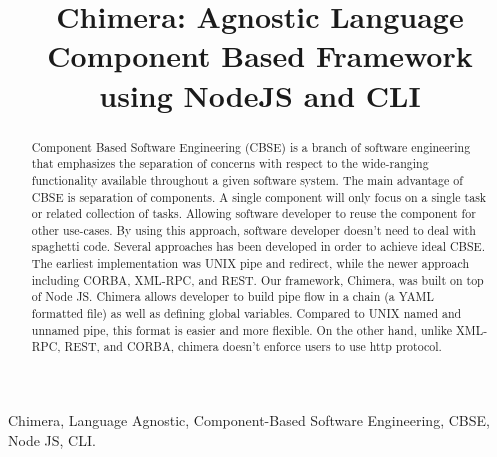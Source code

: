 \documentclass[conference]{IEEEtran}
\begin{document}
\title{Chimera: Agnostic Language Component Based Framework using NodeJS and CLI}

\author{
\and
{}
\and
{}
}

\maketitle


\begin{abstract}
Component Based Software Engineering (CBSE) is a branch of software 
engineering that emphasizes the separation of concerns with respect to the 
wide-ranging functionality available throughout a given software system.  The 
main advantage of CBSE is separation of components. A single component will 
only focus on a single task or related collection of tasks. Allowing software 
developer to reuse the component for other use-cases. By using this approach, 
software developer doesn't need to deal with spaghetti code. Several 
approaches has been developed in order to achieve ideal CBSE. The earliest 
implementation was UNIX pipe and redirect, while the newer approach including 
CORBA, XML-RPC, and REST. Our framework, Chimera, was built on top of Node JS. 
Chimera allows developer to build pipe flow in a chain (a YAML formatted file) 
as well as defining global variables. Compared to UNIX named and unnamed pipe, 
this format is easier and more flexible. On the other hand, unlike XML-RPC, 
REST, and CORBA, chimera doesn't enforce users to use http protocol.
\end{abstract}

\begin{IEEEkeywords}
Chimera, Language Agnostic, Component-Based Software Engineering, CBSE, Node JS, CLI.
\end{IEEEkeywords}

\IEEEpeerreviewmaketitle
\end{document}
